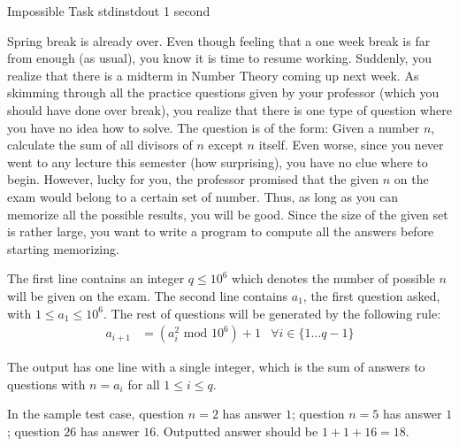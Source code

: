 \begin{problem}{Impossible Task}
{stdin}{stdout}
{1 second}{}{}

Spring break is already over. Even though feeling that a one week break is far from enough (as usual), 
you know it is time to resume working. Suddenly, you realize that there is a midterm in Number Theory
coming up next week. As skimming through all the practice questions given by your professor (which 
you should have done over break), you realize that there is one type of question where you have no idea
how to solve. The question is of the form: Given a number $n$, calculate the sum of all divisors of $n$ except
$n$ itself. Even worse, since you never went to any lecture this semester (how surprising), you have no
clue where to begin. However, lucky for you, the professor promised that the given $n$ on the exam would
belong to a certain set of number. Thus, as long as you can memorize all the possible results, you will be
good. Since the size of the given set is rather large, you want to write a program to compute all the answers before
starting memorizing.

\InputFile

The first line contains an integer $q \leq 10^6$ which denotes the number of possible $n$ will be given on the exam. The second line contains $a_1$, the first question asked, with $1 \le a_1 \le 10^6$. The rest of questions will be generated by the following rule: 
\begin{align*}
	a_{i+1} &= (a_i^2 \text{ mod } 10^6) + 1 & \forall i \in \{1 \hdots q-1\}
\end{align*}

\OutputFile

The output has one line with a single integer, which is the sum of answers to questions with $n = a_i$ for all $1 \le i \le q$. 

\Examples

\begin{example}
%
\end{example}

\Notes

In the sample test case, question $n = 2$ has answer $1$; question $n = 5$ has answer $1$; question $26$ has answer $16$. Outputted answer should be $1 + 1 + 16 = 18$. 

\end{problem}
